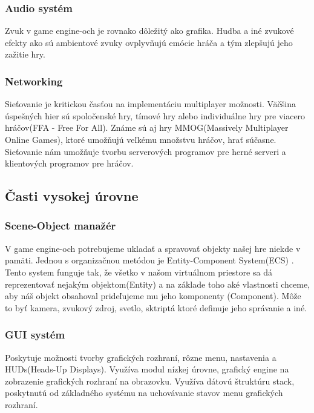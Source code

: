 \documentclass[10pt,oneside,slovak,a4paper,hidelinks]{article}
\begin{document}
		\subsubsection{Audio systém}
			Zvuk v game engine-och je rovnako dôležitý ako grafika. Hudba a iné zvukové efekty ako sú ambientové zvuky ovplyvňujú emócie hráča a tým zlepšujú jeho zažitie hry.
		\subsubsection{Networking}
			Sieťovanie je kritickou časťou na implementáciu multiplayer možnosti. Väčšina úspešných hier sú spoločenské hry, tímové hry alebo individuálne hry pre viacero hráčov(FFA - Free For All). Známe sú aj hry MMOG(Massively Multiplayer Online Games), ktoré umožňujú veľkému množstvu hráčov, hrať súčasne. Sieťovanie nám umožňuje tvorbu serverových programov pre herné serveri a klientových programov pre hráčov.
	\subsection{Časti vysokej úrovne}
		\subsubsection{Scene-Object manažér}
			V game engine-och potrebujeme ukladať a spravovať objekty našej hre niekde v pamäti. Jednou s organizačnou metódou je Entity-Component System(ECS) \cite{ECS}. Tento system funguje tak, že všetko v našom virtuálnom priestore sa dá reprezentovať nejakým objektom(Entity) a na základe toho aké vlastnosti chceme, aby náš objekt obsahoval prideľujeme mu jeho komponenty (Component). Môže to byť kamera, zvukový zdroj, svetlo, sktriptá ktoré definuje jeho správanie a iné.
		\subsubsection{GUI systém}
			Poskytuje možnosti tvorby grafických rozhraní, rôzne menu, nastavenia a HUDs(Heads-Up Displays). Využíva modul nízkej úrovne, grafický engine na zobrazenie grafických rozhraní na obrazovku. Využíva dátovú štruktúru stack, poskytnutú od základného systému na uchovávanie stavov menu grafických rozhraní.
\end{document}
